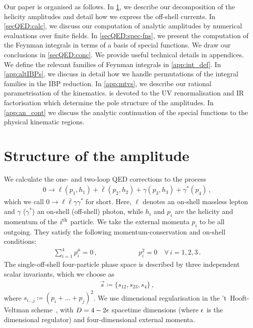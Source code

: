 \documentclass[main.tex]{subfiles}
\begin{document}
Our paper is organised as follows.
In \cref{secQED:structure}, we describe our decomposition of the helicity amplitudes and detail how we express the off-shell currents.
In \cref{secQED:calc}, we discuss our computation of analytic amplitudes by numerical evaluations over finite fields.
In \cref{secQED:spec-fns}, we present the computation of the Feynman integrals in terms of a basis of special functions.
We draw our conclusions in \cref{secQED:conc}.
We provide useful technical details in appendices. 
We define the relevant families of Feynman integrals in \cref{app:int_def}.
In \cref{app:altIBPs}, we discuss in detail how we handle permutations of the integral families in the \ac{IBP} reduction.
In \cref{app:mtvs}, we describe our rational parametrisation of the kinematics.
 is devoted to the \ac{UV} renormalisation and \ac{IR} factorisation which determine the pole structure of the amplitudes.
In \cref{app:an_cont} we discuss the analytic continuation of the special functions to the physical kinematic regions.

\section{Structure of the amplitude}
\label{secQED:structure}

We calculate the one- and two-loop \ac{QED} corrections to the process
\begin{align}
    \label{eqQED:scatter}
    0 \to \ell(p_1,h_1) + \bar{\ell}(p_2,h_2) + \gamma(p_3,h_3) + \gamma^{*}(p_4) \,,
\end{align}
which we call $0\to \ell \bar\ell \gamma \gamma^*$ for short. 
Here, $\ell$ denotes an on-shell massless lepton and $\gamma$ ($\gamma^*$) an on-shell (off-shell) photon, while $h_i$ and $p_i$ are the helicity and momentum of the $i\textsuperscript{th}$ particle.
We take the external momenta $p_i$ to be all outgoing. They satisfy the following momentum-conservation and on-shell conditions:
\begin{align}
    \sum_{i=1}^{4} p_i^\mu = 0 \,, \qquad \qquad \qquad p_i^2 = 0 \quad \forall \, i=1,2,3\,.
\end{align}
The single-off-shell four-particle phase space is described by three independent scalar invariants, which we choose as
\begin{align}
    \vec{s} \coloneqq \{s_{12}, s_{23}, s_4\} \,,
\end{align}
where $s_{i\ldots j} \coloneqq (p_i+\ldots+p_j)^2$.
We use dimensional regularisation in the 't~Hooft-Veltman scheme~\cite{Gnendiger:2017pys}, with $D=4-2\epsilon$ spacetime dimensions (where $\epsilon$ is the dimensional regulator) and four-dimensional external momenta.
\end{document}
